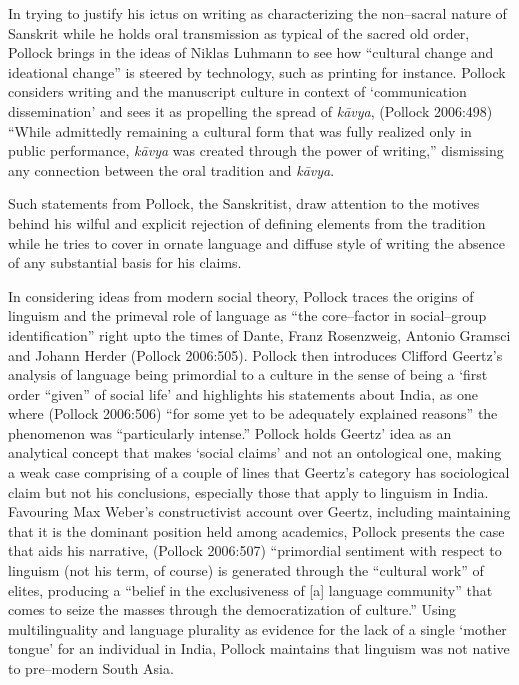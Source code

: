In trying to justify his ictus on writing as characterizing the non–sacral nature of Sanskrit while he holds oral transmission as typical of the sacred old order, Pollock brings in the ideas of Niklas Luhmann to see how “cultural change and ideational change” is steered by technology, such as printing for instance. Pollock considers writing and the manuscript culture in context of ‘communication dissemination’ and sees it as propelling the spread of \textit{kāvya}, (Pollock 2006:498) “While admittedly remaining a cultural form that was fully realized only in public performance, \textit{kāvya} was created through the power of writing,” dismissing any connection between the oral tradition and \textit{kāvya}.

Such statements from Pollock, the Sanskritist, draw attention to the motives behind his wilful and explicit rejection of defining elements from the tradition while he tries to cover in ornate language and diffuse style of writing the absence of any substantial basis for his claims.

In considering ideas from modern social theory, Pollock traces the origins of linguism and the primeval role of language as “the core–factor in social–group identification” right upto the times of Dante, Franz Rosenzweig, Antonio Gramsci and Johann Herder (Pollock 2006:505). Pollock then introduces Clifford Geertz’s analysis of language being primordial to a culture in the sense of being a ‘first order “given” of social life’ and highlights his statements about India, as one where (Pollock 2006:506) “for some yet to be adequately explained reasons” the phenomenon was “particularly intense.” Pollock holds Geertz’ idea as an analytical concept that makes ‘social claims’ and not an ontological one, making a weak case comprising of a couple of lines that Geertz’s category has sociological claim but not his conclusions, especially those that apply to linguism in India. Favouring Max Weber’s constructivist account over Geertz, including maintaining that it is the dominant position held among academics, Pollock presents the case that aids his narrative, (Pollock 2006:507) “primordial sentiment with respect to linguism (not his term, of course) is generated through the “cultural work” of elites, producing a “belief in the exclusiveness of [a] language community” that comes to seize the masses through the democratization of culture.” Using multilinguality and language plurality as evidence for the lack of a single ‘mother tongue’ for an individual in India, Pollock maintains that linguism was not native to pre–modern South Asia.

